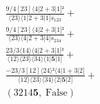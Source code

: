 \documentclass[varwidth, border=5pt]{standalone}
\begin{document}
\begin{my}
$\begin{gathered}
\scriptscriptstyle\frac{9/4[23]⟨4|2+3|1]²}{⟨23⟩⟨1|2+3|1]s_{123}} +\\
\scriptscriptstyle\frac{9/4[23]⟨4|2+3|1]²}{⟨23⟩⟨4|2+3|4]s_{234}} +\\
\scriptscriptstyle\frac{23/3⟨14⟩⟨4|2+3|1]²}{⟨12⟩⟨23⟩⟨34⟩⟨1|𝟓|1]} +\\
\scriptscriptstyle\frac{-23/3[12]⟨24⟩²⟨4|1+3|2]}{⟨12⟩⟨23⟩⟨34⟩⟨2|𝟓|2]} +\\
\scriptscriptstyle(3214𝟓,\;\text{False}) \phantom{+}
\end{gathered}$
\end{my}
\end{document}
